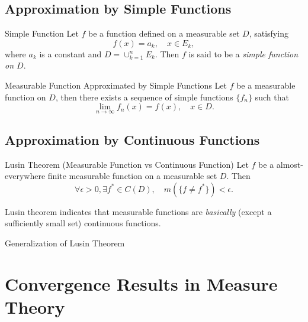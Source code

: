 \subsection{Approximation by Simple Functions}

\begin{definition}{Simple Function}{}
  Let $f$ be a function defined on a measurable set $D$, satisfying
  \begin{equation}
    f(x) = a_k, \quad x \in E_k,
  \end{equation}
  where $a_k$ is a constant and $D = \cup _{k = 1}^n E_k$.
  Then $f$ is said to be a \emph{simple function on $D$}.
\end{definition}

\begin{theorem}{Measurable Function Approximated by Simple Functions}{}
  Let $f$ be a measurable function on $D$,
  then there exists a sequence of simple functions $\{f_n\}$ such that
  \begin{equation}
    \lim \limits _{n \rightarrow \infty} f_n(x) = f(x), \quad x \in D.
  \end{equation}
\end{theorem}

\subsection{Approximation by Continuous Functions}

\begin{theorem}{Lusin Theorem (Measurable Function vs Continuous Function)}{}
  Let $f$ be a almost-everywhere finite measurable function on a measurable set
  $D$.
  Then
  \begin{equation}
    \forall \epsilon > 0, \exists f^{\ast} \in C(D), \quad
    m(\{f \neq f^{\ast}\}) < \epsilon.
  \end{equation}
\end{theorem}

\begin{note}
  Lusin theorem indicates that measurable functions are
  \emph{basically} (except a sufficiently small set) continuous functions.
\end{note}

\begin{example}{Generalization of Lusin Theorem}{}
  
\end{example}

\section{Convergence Results in Measure Theory}

